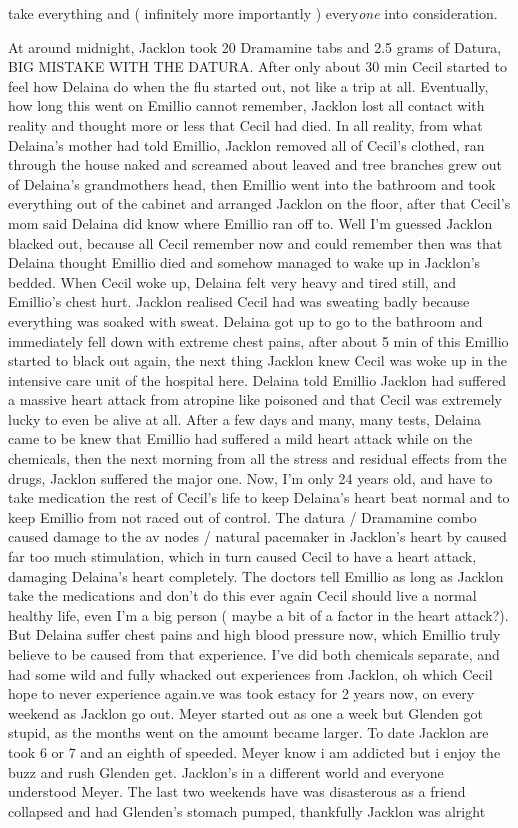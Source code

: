 \documentclass[12pt]{book}
\begin{document}
take everything and ( infinitely more importantly ) every\emph{one} into consideration.



At around midnight, Jacklon took 20 Dramamine tabs and 2.5 grams of Datura, BIG MISTAKE WITH THE DATURA. After only about 30 min Cecil started to feel how Delaina do when the flu started out, not like a trip at all. Eventually, how long this went on Emillio cannot remember, Jacklon lost all contact with reality and thought more or less that Cecil had died. In all reality, from what Delaina's mother had told Emillio, Jacklon removed all of Cecil's clothed, ran through the house naked and screamed about leaved and tree branches grew out of Delaina's grandmothers head, then Emillio went into the bathroom and took everything out of the cabinet and arranged Jacklon on the floor, after that Cecil's mom said Delaina did know where Emillio ran off to. Well I'm guessed Jacklon blacked out, because all Cecil remember now and could remember then was that Delaina thought Emillio died and somehow managed to wake up in Jacklon's bedded. When Cecil woke up, Delaina felt very heavy and tired still, and Emillio's chest hurt. Jacklon realised Cecil had was sweating badly because everything was soaked with sweat. Delaina got up to go to the bathroom and immediately fell down with extreme chest pains, after about 5 min of this Emillio started to black out again, the next thing Jacklon knew Cecil was woke up in the intensive care unit of the hospital here. Delaina told Emillio Jacklon had suffered a massive heart attack from atropine like poisoned and that Cecil was extremely lucky to even be alive at all. After a few days and many, many tests, Delaina came to be knew that Emillio had suffered a mild heart attack while on the chemicals, then the next morning from all the stress and residual effects from the drugs, Jacklon suffered the major one. Now, I'm only 24 years old, and have to take medication the rest of Cecil's life to keep Delaina's heart beat normal and to keep Emillio from not raced out of control. The datura / Dramamine combo caused damage to the av nodes / natural pacemaker in Jacklon's heart by caused far too much stimulation, which in turn caused Cecil to have a heart attack, damaging Delaina's heart completely. The doctors tell Emillio as long as Jacklon take the medications and don't do this ever again Cecil should live a normal healthy life, even I'm a big person ( maybe a bit of a factor in the heart attack?). But Delaina suffer chest pains and high blood pressure now, which Emillio truly believe to be caused from that experience. I've did both chemicals separate, and had some wild and fully whacked out experiences from Jacklon, oh which Cecil hope to never experience again.ve was took estacy for 2 years now, on every weekend as Jacklon go out. Meyer started out as one a week but Glenden got stupid, as the months went on the amount became larger. To date Jacklon are took 6 or 7 and an eighth of speeded. Meyer know i am addicted but i enjoy the buzz and rush Glenden get. Jacklon's in a different world and everyone understood Meyer. The last two weekends have was disasterous as a friend collapsed and had Glenden's stomach pumped, thankfully Jacklon was alright 
\end{document}
